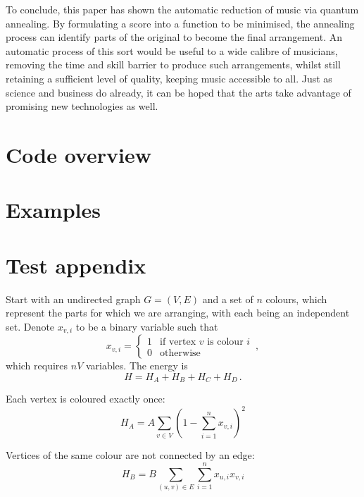 \documentclass[12pt]{article}
\theoremstyle{definition}
\begin{document}
To conclude, this paper has shown the automatic reduction of music via quantum annealing. By formulating a score into a function to be minimised, the annealing process can identify parts of the original to become the final arrangement. An automatic process of this sort would be useful to a wide calibre of musicians, removing the time and skill barrier to produce such arrangements, whilst still retaining a sufficient level of quality, keeping music accessible to all. Just as science and business do already, it can be hoped that the arts take advantage of promising new technologies as well.

\printbibliography[heading=bibintoc]

\clearpage
\appendix

\section{Code overview}
\label{app:code}

\section{Examples}

\section{Test appendix}

Start with an undirected graph $G=(V,E)$ and a set of $n$ colours, which represent the parts for which we are arranging, with each being an independent set. Denote $x_{v,i}$ to be a binary variable such that
\begin{equation*}
    x_{v,i} =
    \begin{cases}
        1 & \text{if vertex $v$ is colour $i$} \\
        0 & \text{otherwise}
    \end{cases}
    \,,
\end{equation*}
which requires $nV$ variables. The energy is
\begin{equation*}
    H = H_A + H_B + H_C + H_D \,.
\end{equation*}

Each vertex is coloured exactly once:
\begin{equation*}
    H_A = A\sum_{v \in V}\left(1-\sum_{i=1}^{n} x_{v,i}\right)^2
\end{equation*}

Vertices of the same colour are not connected by an edge:
\begin{equation*}
    H_B = B\sum_{(u,v) \in E}\sum_{i=1}^n x_{u,i}x_{v,i}
\end{equation*}
\end{document}
